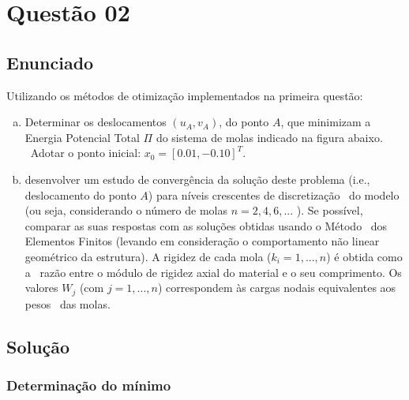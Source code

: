 \documentclass[10pt, a4paper]{article}
\begin{document}
\section{Questão 02}

\subsection{Enunciado}

Utilizando os métodos de otimização implementados na primeira questão:

\begin{enumerate}[(a)]
  \item Determinar os deslocamentos $(u_A, v_A)$, do ponto $A$, que minimizam a Energia Potencial Total $\Pi$ do sistema de molas indicado na figura abaixo. \
  Adotar o ponto inicial: $x_0 = [0.01, -0.10]^T$.
  \item desenvolver um estudo de convergência da solução deste problema (i.e., deslocamento do ponto $A$) para níveis crescentes de discretização \
  do modelo (ou seja, considerando o número de molas $n = 2, 4, 6, ...$ ). Se possível, comparar as suas respostas com as soluções obtidas usando o Método \
  dos Elementos Finitos (levando em consideração o comportamento não linear geométrico da estrutura). A rigidez de cada mola ($k_i = 1, ..., n$) é obtida como a \
  razão entre o módulo de rigidez axial do material e o seu comprimento. Os valores $W_j$ (com $j = 1, ..., n$) correspondem às cargas nodais equivalentes aos pesos \
  das molas.
\end{enumerate}

\subsection{Solução}

\subsubsection{Determinação do mínimo}
\end{document}

